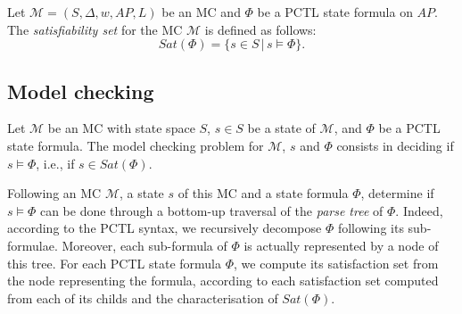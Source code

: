 \begin{definition}
  Let $\mathcal{M}=(S, \Delta, w, AP, L)$ be an MC and $\Phi$ be a PCTL state formula on $AP$. The \textit{satisfiability set} for the MC $\mathcal{M}$ is defined as follows:
  \[
    Sat(\Phi) = \{ s \in S \, | \, s \models \Phi \}.
  \]
\end{definition}

\subsection*{Model checking}
\begin{definition}
Let $\mathcal{M}$ be an MC with state space $S$, $s \in S$ be a state of $\mathcal{M}$, and $\Phi$ be a PCTL state formula. The model checking problem for $\mathcal{M}$, $s$ and $\Phi$ consists in deciding if $s \models \Phi$, i.e., if $s \in Sat(\Phi)$.
\end{definition}
Following an MC $\mathcal{M}$, a state $s$ of this MC and a state formula $\Phi$, determine if $s \models \Phi$ can be done through a bottom-up traversal of the \textit{parse tree} of $\Phi$.
Indeed, according to the PCTL syntax, we recursively decompose $\Phi$ following its sub-formulae. Moreover, each sub-formula of $\Phi$ is actually represented by a node of this tree. For each PCTL state formula $\Phi$, we compute its satisfaction set from the node representing the formula, according to each satisfaction set computed from each of its childs and the characterisation of $Sat(\Phi)$.

